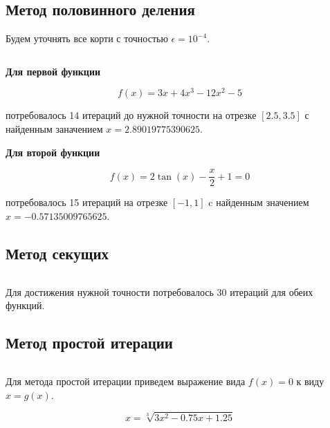 \documentclass[../main.tex]{subfiles}
\begin{document}
\subsection{Метод половинного деления}

Будем уточнять все корти с точностью $\epsilon = 10^{-4}$.
\bigskip

\inputminted[mathescape,frame=single,framesep=2mm,fontsize=\scriptsize,
label=bisection.go (\href{https://github.com/barklan/computational_mathematics}{GitHub})
]{go}{
../numerical/bisection.go
}

\textbf{Для первой функции}

$$ f(x) = 3x + 4x^3 - 12 x^2 - 5 $$

потребовалось 14 итераций до нужной точности на отрезке $[2.5, 3.5]$ с найденным заначением $x = 2.89019775390625$.

\textbf{Для второй функции}

$$  f(x) = 2 \tan (x) - \frac{x}{2} + 1 = 0 $$

потребовалось 15 итераций на отрезке $[-1, 1]$ c найденным значением $x = -0.57135009765625$.

\newpage
\subsection{Метод секущих}
\bigskip

\inputminted[mathescape,frame=single,framesep=2mm,fontsize=\scriptsize,
label=secant.go
]{go}{
../numerical/secant.go
}

Для достижения нужной точности потребовалось 30 итераций для обеих функций.

\newpage
\subsection{Метод простой итерации}

\bigskip
\inputminted[mathescape,frame=single,framesep=2mm,fontsize=\scriptsize,
label=fixed\_point\_iteration.go
]{go}{
../numerical/fixed_point_iteration.go
}

Для метода простой итерации приведем выражение вида $f(x) = 0$ к виду $x = g(x)$.

$$ x = \sqrt[3]{3x^2 - 0.75x + 1.25} $$
\end{document}
